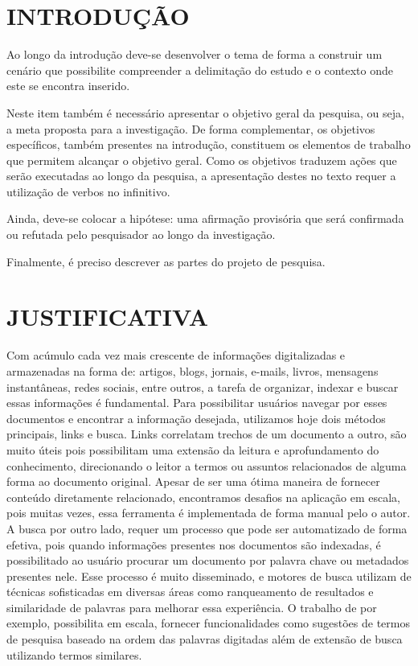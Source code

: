 \documentclass[12pt,a4paper]{article}
\begin{document}
  \newpage
  \pagestyle{plain}
  \renewcommand{\baselinestretch}{1.5}
  \normalsize
  \section{INTRODUÇÃO}
  Ao longo da introdução deve-se desenvolver o tema de forma a construir um cenário que possibilite compreender a delimitação do estudo e o contexto onde este se encontra inserido.
  
  Neste item também é necessário apresentar o objetivo geral da pesquisa, ou seja, a meta proposta para a investigação. De forma complementar, os objetivos específicos, também presentes na introdução, constituem os elementos de trabalho que permitem alcançar o objetivo geral. Como os objetivos traduzem ações que serão executadas ao longo da pesquisa, a apresentação destes no texto requer a utilização de verbos no infinitivo.
  
  Ainda, deve-se colocar a hipótese: uma afirmação provisória que será confirmada ou refutada pelo pesquisador ao longo da investigação.
  
  Finalmente, é preciso descrever as partes do projeto de pesquisa.
  
  
  
  \section{JUSTIFICATIVA}
  Com acúmulo cada vez mais crescente de informações digitalizadas e armazenadas na forma de: artigos, blogs, jornais, e-mails, livros, mensagens instantâneas, redes sociais, entre outros, a tarefa de organizar, indexar e buscar essas informações é fundamental. Para possibilitar usuários navegar por esses documentos e encontrar a informação desejada, utilizamos hoje dois métodos principais, links e busca. Links correlatam trechos de um documento a outro, são muito úteis pois possibilitam uma extensão da leitura e aprofundamento do conhecimento, direcionando o leitor a termos ou assuntos relacionados de alguma forma ao documento original. Apesar de ser uma ótima maneira de fornecer conteúdo diretamente relacionado, encontramos desafios na aplicação em escala, pois muitas vezes, essa ferramenta  é implementada de forma manual pelo o autor. A busca por outro lado, requer um processo que pode ser automatizado de forma efetiva, pois quando informações presentes nos documentos são indexadas, é possibilitado ao usuário procurar um documento por palavra chave ou metadados presentes nele. Esse processo é muito disseminado, e motores de busca utilizam de técnicas sofisticadas em diversas áreas como ranqueamento de resultados e similaridade de palavras para melhorar essa experiência. O trabalho de  por exemplo, possibilita em escala, fornecer funcionalidades como sugestões de termos de pesquisa baseado na ordem das palavras digitadas além de extensão de busca utilizando termos similares.
  
\end{document}
